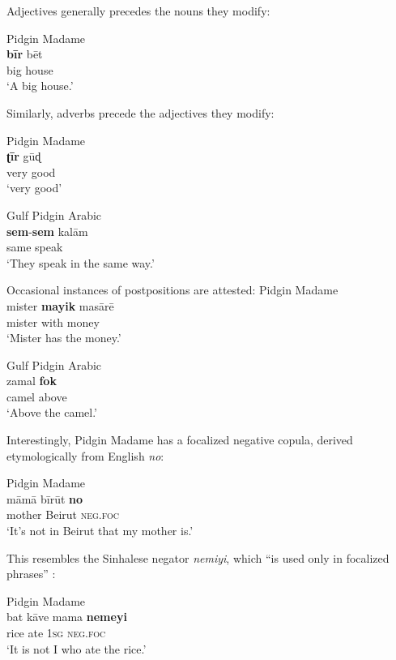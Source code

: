 \documentclass[output=paper]{langsci/langscibook}
\begin{document}
Adjectives generally precedes the nouns they modify:

\ea\label{ex:key:}
{ Pidgin Madame \citep[119]{Bizri2010}}\\
\gll   \textbf{bī}\textbf{r} bēt\\
       big house\\
\glt     `A big house.'
\z

Similarly, adverbs precede the adjectives they modify:

\ea\label{ex:key:}
\ea Pidgin Madame \citep[119]{Bizri2010}\\
\gll     \textbf{ʈīr} gūɖ\\
         very good\\
\glt       `very good'

\ex\label{ex:key:}
Gulf Pidgin Arabic \citep[25]{Avram2014Pidgin}\\
\gll     \textbf{sem}-\textbf{sem} kalām\\
         same speak \\
\glt       `They speak in the same way.'
 \z
 \z

  Occasional instances of postpositions are attested:
\ea\label{ex:key:}
\ea Pidgin Madame \citep[132]{Bizri2010}\\
\gll     mister \textbf{mayik} masārē\\
         mister with money\\
\glt    `Mister has the money.'

\ex\label{ex:key:}
Gulf Pidgin Arabic \citep[25]{Avram2014Pidgin}\\
\gll     zamal \textbf{fok} \\
         camel above\\
\glt       `Above the camel.'
\z
\z

Interestingly, Pidgin Madame has a focalized negative copula, derived etymologically from English \textit{no}:

\ea\label{ex:key:}
{ Pidgin Madame \citep[133]{Bizri2010}}\\
\gll   māmā bīrūt \textbf{no}\\
       mother Beirut \textsc{neg}.\textsc{foc}\\
\glt     `It’s not in Beirut that my mother is.'
\z

This resembles the Sinhalese negator \textit{nemiyi}, which “is used only in focalized phrases” \citep[69]{Bizri2010}:

\ea\label{ex:key:}
{ Pidgin Madame \citep[69]{Bizri2010}}\\
\gll   bat kāve mama \textbf{nemeyi}\\
       rice ate 1\textsc{sg} \textsc{neg}.\textsc{foc}\\
\glt     `It is not I who ate the rice.'
\z
\end{document}
